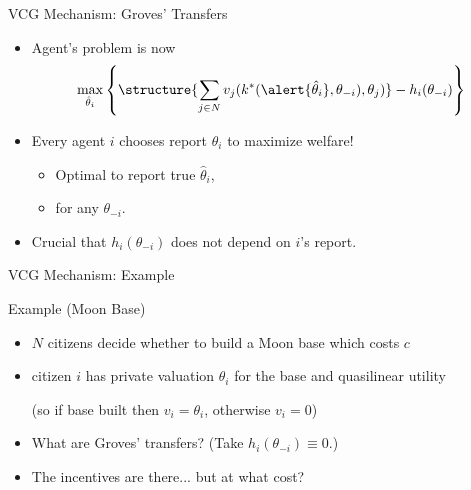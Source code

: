 \documentclass[english,10pt
,aspectratio=169
]{beamer}
\begin{document}
\begin{frame}{VCG Mechanism: Groves' Transfers}
\begin{itemize}
	\item Agent's problem is now
	\vspace{-0.5em}\begin{align*}
	\max_{\hat{\theta}_i} \left\{ \structure{ \sum_{j \in N} v_{j}(k^*(\alert{\hat{\theta}_i},\theta_{-i}), \theta_{j}) } - h_{i}(\theta_{-i}) \right\}
	\end{align*}
	\item Every agent $i$ chooses report $\hat{\theta}_i$ to maximize welfare!
	\begin{itemize}
		\item Optimal to report true $\hat{\theta}_i$,
		\item for any $\theta_{-i}$.
	\end{itemize}
	\item Crucial that $h_i(\theta_{-i})$ does not depend on $i$'s report.
\end{itemize}
\end{frame}


\begin{frame}{VCG Mechanism: Example}
\begin{exampleblock}{Example (Moon Base)}
	\begin{itemize}
		\item $N$ citizens decide whether to build a Moon base which costs $c$
		\item citizen $i$ has private valuation $\theta_{i}$ for the base and quasilinear utility
		
		(so if base built then $v_i = \theta_i$, otherwise $v_i = 0$)
	\end{itemize}
\end{exampleblock}
\begin{itemize}
	\item What are Groves' transfers? (Take $h_i(\theta_{-i}) \equiv 0$.)
	\item The incentives are there... but at what cost?
\end{itemize}
\end{frame}
\end{document}
